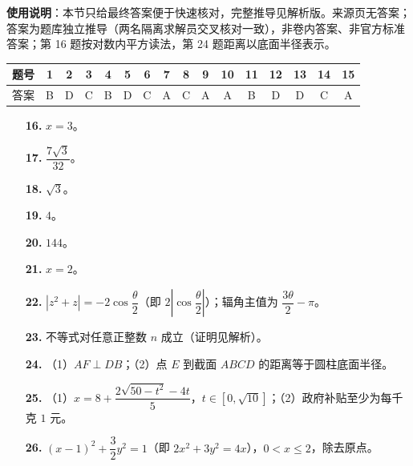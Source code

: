 
\begin{gknotice}
\textbf{使用说明}：本节只给最终答案便于快速核对，完整推导见解析版。来源页无答案；答案为题库独立推导（两名隔离求解员交叉核对一致），非卷内答案、非官方标准答案；第 16 题按对数内平方读法，第 24 题距离以底面半径表示。
\end{gknotice}

\begin{center}\begin{tabular}{cccccccccccccccc}
\toprule
题号 & 1 & 2 & 3 & 4 & 5 & 6 & 7 & 8 & 9 & 10 & 11 & 12 & 13 & 14 & 15 \\
\midrule
答案 & B & D & C & B & D & C & A & C & A & A & B & D & D & C & A \\
\bottomrule
\end{tabular}\end{center}

\begin{itemize}[leftmargin=2.6em]
  \item[\textbf{16.}] $x=3$。
  \item[\textbf{17.}] $\dfrac{7\sqrt3}{32}$。
  \item[\textbf{18.}] $\sqrt3$。
  \item[\textbf{19.}] $4$。
  \item[\textbf{20.}] $144$。
\end{itemize}

\begin{itemize}[leftmargin=2.6em]
  \item[\textbf{21.}] $x=2$。
  \item[\textbf{22.}] $|z^2+z|=-2\cos\dfrac\theta2$（即 $2\left|\cos\dfrac\theta2\right|$）；辐角主值为 $\dfrac{3\theta}{2}-\pi$。
  \item[\textbf{23.}] 不等式对任意正整数 $n$ 成立（证明见解析）。
  \item[\textbf{24.}] （1）$AF\perp DB$；（2）点 $E$ 到截面 $ABCD$ 的距离等于圆柱底面半径。
  \item[\textbf{25.}] （1）$x=8+\dfrac{2\sqrt{50-t^2}-4t}{5}$，$t\in[0,\sqrt{10}]$；（2）政府补贴至少为每千克 $1$ 元。
  \item[\textbf{26.}] $(x-1)^2+\dfrac32y^2=1$（即 $2x^2+3y^2=4x$），$0<x\le2$，除去原点。
\end{itemize}
